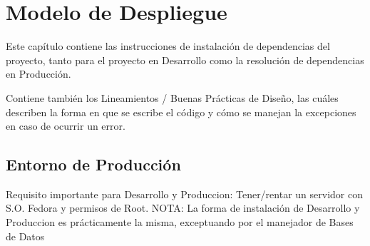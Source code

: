 \chapter{Modelo de Despliegue}
\label{cap:despliegue}

Este capítulo contiene las instrucciones de instalación de dependencias del proyecto, tanto para el proyecto en Desarrollo como la resolución de dependencias en Producción.

Contiene también los Lineamientos / Buenas Prácticas de Diseño, las cuáles describen la forma en que se escribe el código y cómo se manejan la excepciones en caso de ocurrir un error. \\

\section{Entorno de Producción}

Requisito importante para Desarrollo y Produccion: Tener/rentar un servidor con S.O. Fedora y permisos de Root. NOTA: La forma de instalación de Desarrollo y Produccion es prácticamente la misma, exceptuando por el manejador de Bases de Datos \\

